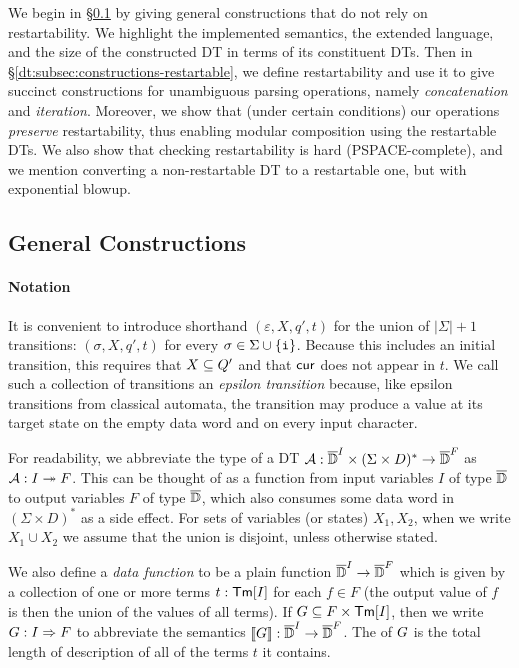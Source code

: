 We begin in \S\ref{dt:subsec:constructions-general} by giving general constructions that do not rely on restartability. We highlight the implemented semantics, the extended language, and the size of the constructed DT in terms of its constituent DTs.
Then in \S\ref{dt:subsec:constructions-restartable}, we define restartability and use it to give succinct constructions for unambiguous parsing operations, namely \emph{concatenation} and \emph{iteration}.
Moreover, we show that (under certain conditions) our operations \emph{preserve} restartability, thus enabling modular composition using the restartable DTs. We also show that checking restartability is hard (PSPACE-complete), and we mention converting a non-restartable DT to a restartable one, but with exponential blowup.

\subsection{General Constructions}
\label{dt:subsec:constructions-general}

\paragraph*{Notation}
It is convenient to introduce shorthand $(\varepsilon, X, q', t)$ for the union of $|\Sigma| + 1$ transitions: $(\sigma, X, q', t)$ for every $\sigma \in \Sigma \cup \{{\texttt{i}}\}$. Because this includes an initial transition, this requires that $X \subseteq Q'$ and that $\mathsf{cur}$ does not appear in $t$. We call such a collection of transitions an \emph{epsilon transition} because, like epsilon transitions from classical automata, the transition may produce a value at its target state on the empty data word and on every input character.

For readability, we abbreviate the type of a DT
$\mathcal{A}: \overline{\mathbb{D}{}}^I \times (\Sigma \times D)^* \to \overline{\mathbb{D}{}}^F$ as $\mathcal{A}: I \twoheadrightarrow F$.
This can be thought of as a function from input variables $I$ of type $\overline{\mathbb{D}{}}$ to output variables $F$ of type $\overline{\mathbb{D}{}}$, which also consumes some data word in $(\Sigma \times D)^*$ as a side effect.
For sets of variables (or states) $X_1, X_2$, when we write $X_1 \cup X_2$ we assume that the union is disjoint, unless otherwise stated.

We also define a \emph{data function} to be a plain function $\overline{\mathbb{D}{}}^I \to \overline{\mathbb{D}{}}^F$ which is
given by a collection of one or more terms $t : \textsf{Tm}[I]$ for each $f \in F$ (the output value of $f$ is then the union of the values of all terms). If $G \subseteq F \times \textsf{Tm}[I]$, then we write $G: I \Rightarrow F$ to abbreviate the semantics $\llbracket G \rrbracket: \overline{\mathbb{D}{}}^I \to \overline{\mathbb{D}{}}^F$.
The  of $G$ is the total length of description of all of the terms $t$ it contains.

